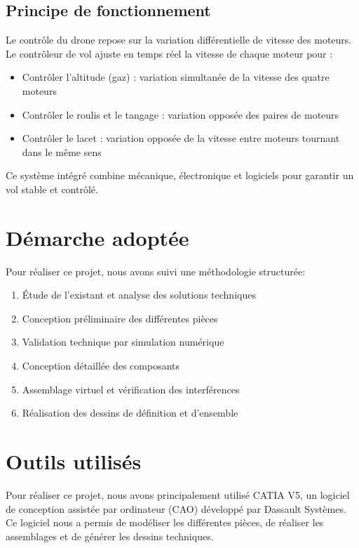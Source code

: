 \documentclass[a4paper,12pt]{report}
\begin{document}
\subsection*{Principe de fonctionnement}
Le contrôle du drone repose sur la variation différentielle de vitesse des moteurs. Le contrôleur de vol ajuste en temps réel la vitesse de chaque moteur pour :
\begin{itemize}
    \item Contrôler l'altitude (gaz) : variation simultanée de la vitesse des quatre moteurs
    \item Contrôler le roulis et le tangage : variation opposée des paires de moteurs
    \item Contrôler le lacet : variation opposée de la vitesse entre moteurs tournant dans le même sens
\end{itemize}

Ce système intégré combine mécanique, électronique et logiciels pour garantir un vol stable et contrôlé.

\section{Démarche adoptée}
Pour réaliser ce projet, nous avons suivi une méthodologie structurée:
\begin{enumerate}
    \item Étude de l'existant et analyse des solutions techniques
    \item Conception préliminaire des différentes pièces
    \item Validation technique par simulation numérique
    \item Conception détaillée des composants
    \item Assemblage virtuel et vérification des interférences
    \item Réalisation des dessins de définition et d'ensemble
\end{enumerate}

\section{Outils utilisés}
Pour réaliser ce projet, nous avons principalement utilisé CATIA V5, un logiciel de conception assistée par ordinateur (CAO) développé par Dassault Systèmes. Ce logiciel nous a permis de modéliser les différentes pièces, de réaliser les assemblages et de générer les dessins techniques.
\end{document}
